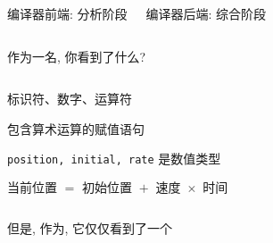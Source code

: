 \begin{frame}{}
  \begin{columns}
      \begin{center}
        编译器前端: 分析阶段

      \end{center}
      \begin{center}
        编译器后端: 综合阶段

      \end{center}
  \end{columns}

  \pause
\end{frame}

\begin{frame}{}
  \begin{center}
    作为一名, 你看到了什么?

    \vspace{0.10cm}

    \vspace{0.20cm}
    \begin{columns}
        \begin{description}
          \setlength{\itemsep}{12pt}
          \pause
          \item[词法:] 标识符、数字、运算符
          \pause
          \item[语法:] 包含算术运算的赋值语句
          \pause 
          \item[语义:] \texttt{position, initial, rate} 是数值类型
          \pause
          \item[物理定律:] $\text{当前位置 } = \text{ 初始位置 } + \text{ 速度 } \times \text{ 时间}$
        \end{description}
    \end{columns}

    \pause
    \vspace{1.00cm}
    但是, 作为, 它仅仅看到了一个
  \end{center}
\end{frame}

